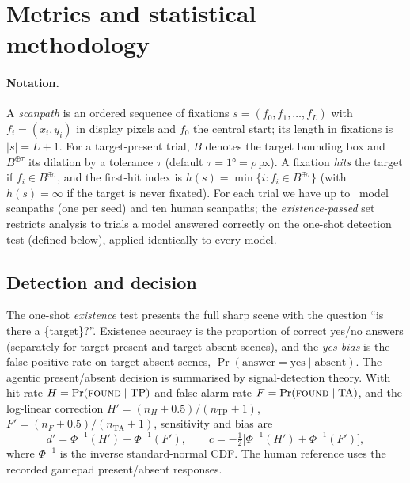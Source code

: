 \documentclass[runningheads]{llncs}
\begin{document}
 
\section{Metrics and statistical methodology}\label{sec:metrics}
 
\paragraph{Notation.} A \emph{scanpath} is an ordered sequence of fixations
$s=(f_0,f_1,\dots,f_{L})$ with $f_i=(x_i,y_i)$ in display pixels and $f_0$ the central start; its length
in fixations is $|s|=L{+}1$. For a target-present trial, $B$ denotes the target bounding box and
$B^{\oplus\tau}$ its dilation by a tolerance $\tau$ (default $\tau{=}1°{=}\rho$\,px). A fixation
\emph{hits} the target if $f_i\in B^{\oplus\tau}$, and the first-hit index is
$h(s)=\min\{i: f_i\in B^{\oplus\tau}\}$ (with $h(s)=\infty$ if the target is never fixated). For each
trial we have up to \NSeeds\ model scanpaths (one per seed) and ten human scanpaths; the
\emph{existence-passed} set restricts analysis to trials a model answered correctly on the one-shot
detection test (defined below), applied identically to every model.
 
\subsection{Detection and decision}\label{sec:m-dec}
The one-shot \emph{existence} test presents the full sharp scene with the question ``is there a
\{target\}?''. Existence accuracy is the proportion of correct yes/no answers (separately for
target-present and target-absent scenes), and the \emph{yes-bias} is the false-positive rate on
target-absent scenes, $\Pr(\text{answer}{=}\text{yes}\mid\text{absent})$. The agentic present/absent
decision is summarised by signal-detection theory. With hit rate $H=\Pr(\textsc{found}\mid\text{TP})$ and
false-alarm rate $F=\Pr(\textsc{found}\mid\text{TA})$, and the log-linear correction
$H'=(n_H{+}0.5)/(n_{\text{TP}}{+}1)$, $F'=(n_F{+}0.5)/(n_{\text{TA}}{+}1)$, sensitivity and bias are
\begin{equation}
d' = \Phi^{-1}(H') - \Phi^{-1}(F'), \qquad
c  = -\tfrac{1}{2}\big[\Phi^{-1}(H') + \Phi^{-1}(F')\big],
\label{eq:sdt}
\end{equation}
where $\Phi^{-1}$ is the inverse standard-normal CDF. The human reference uses the recorded gamepad
present/absent responses.
 
\end{document}
